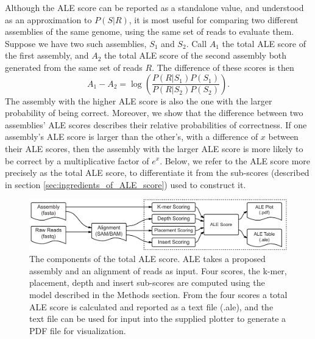 \documentclass[phd,tocprelim]{cornell}
\begin{document}
Although the ALE score can be reported as a standalone value, and understood as an approximation to $P(S|R)$, it is most useful for comparing two different assemblies of the same genome, using the same set of reads to evaluate them. Suppose we have two such assemblies, $S_{1}$ and $S_{2}$.  Call $A_{1}$ the total ALE score of the first assembly, and $A_{2}$ the total ALE score of the second assembly both generated from the same set of reads $R$. The difference of these scores is then
\begin{equation}
    A_{1} - A_{2} = \log\left(\frac{P\left(R|S_{1}\right)P\left(S_{1}\right)}{P\left(R|S_{2}\right)P\left(S_{2}\right)}\right).
\end{equation}
The assembly with the higher ALE score is also the one with the larger probability of being correct.  Moreover, we show that the difference between two assemblies' ALE scores describes their relative probabilities of correctness.  If one assembly's ALE score is larger than the other's, with a difference of $x$ between their ALE scores, then the assembly with the larger ALE score is more likely to be correct by a multiplicative factor of $e^{x}$.  Below, we refer to the ALE score more precisely as the total ALE score, to differentiate it from the sub-scores (described in section \ref{sec:ingredients_of_ALE_score}) used to construct it.

\begin{figure}[!tpb]%
    \centerline{\includegraphics[width=\textwidth]{figures/ALE/Clark_Fig1c.pdf}}
    \caption[Components of the ALE score]{The components of the total ALE score. ALE takes a proposed assembly and an alignment of reads as input. Four scores, the k-mer, placement, depth and insert sub-scores are computed using the model described in the Methods section. From the four scores a total ALE score is calculated and reported as a text file (.ale), and the text file can be used for input into the supplied plotter to generate a PDF file for visualization.}\label{fig:01}
\end{figure}
\end{document}
